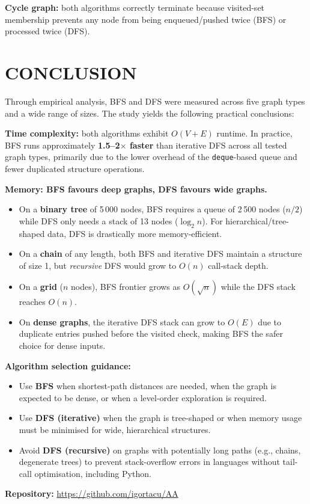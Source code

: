 \documentclass[12pt]{article}
\begin{document}
\textbf{Cycle graph:} both algorithms correctly terminate because visited-set
membership prevents any node from being enqueued/pushed twice (BFS) or processed
twice (DFS).

\section*{CONCLUSION}

\hspace{0.8cm} Through empirical analysis, BFS and DFS were measured across five
graph types and a wide range of sizes.  The study yields the following practical
conclusions:

\textbf{Time complexity:} both algorithms exhibit $O(V + E)$ runtime.  In practice,
BFS runs approximately \textbf{1.5–2$\times$ faster} than iterative DFS across all
tested graph types, primarily due to the lower overhead of the \texttt{deque}-based
queue and fewer duplicated structure operations.

\textbf{Memory: BFS favours deep graphs, DFS favours wide graphs.}
\begin{itemize}
  \item On a \textbf{binary tree} of 5\,000 nodes, BFS requires a queue of 2\,500
        nodes ($n/2$) while DFS only needs a stack of 13 nodes ($\log_2 n$).
        For hierarchical/tree-shaped data, DFS is drastically more memory-efficient.

  \item On a \textbf{chain} of any length, both BFS and iterative DFS maintain a
        structure of size 1, but \emph{recursive} DFS would grow to $O(n)$ call-stack
        depth.

  \item On a \textbf{grid} ($n$ nodes), BFS frontier grows as $O(\sqrt{n})$ while
        the DFS stack reaches $O(n)$.

  \item On \textbf{dense graphs}, the iterative DFS stack can grow to $O(E)$ due to
        duplicate entries pushed before the visited check, making BFS the safer
        choice for dense inputs.
\end{itemize}

\textbf{Algorithm selection guidance:}
\begin{itemize}
  \item Use \textbf{BFS} when shortest-path distances are needed, when the graph is
        expected to be dense, or when a level-order exploration is required.
  \item Use \textbf{DFS (iterative)} when the graph is tree-shaped or when memory
        usage must be minimised for wide, hierarchical structures.
  \item Avoid \textbf{DFS (recursive)} on graphs with potentially long paths (e.g.,
        chains, degenerate trees) to prevent stack-overflow errors in languages
        without tail-call optimisation, including Python.
\end{itemize}

\vspace{0.5cm}
\noindent\textbf{Repository:} \url{https://github.com/igortacu/AA}

\pagebreak
\end{document}
